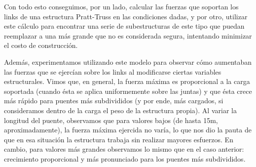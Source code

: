 Con todo esto conseguimos, por un lado, calcular las fuerzas que soportan los links de una estructura Pratt-Truss en las condiciones dadas, y por otro, utilizar este cálculo para encontrar una serie de subestructuras de este tipo que puedan reemplazar a una más grande que no es considerada segura, intentando minimizar el costo de construcción.

Además, experimentamos utilizando este modelo para observar cómo aumentaban las fuerzas que se ejercían sobre los links al modificarse ciertas variables estructurales. Vimos que, en general, la fuerza máxima es proporcional a la carga soportada (cuando ésta se aplica uniformemente sobre las juntas) y que ésta crece más rápido para puentes más subdivididos (y por ende, más cargados, si consideramos dentro de la carga el peso de la estructura propia).  Al variar la longitud del puente, observamos que para valores bajos (de hasta 15m, aproximadamente), la fuerza máxima ejercida no varía, lo que nos dio la pauta de que en esa situación la estructura trabaja sin realizar mayores esfuerzos. En cambio, para valores más grandes observamos lo mismo que en el caso anterior: crecimiento proporcional y más pronunciado para los puentes más subdivididos.